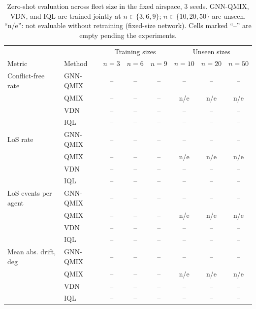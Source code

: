 \begin{table}[hbt!]
\caption{\label{tab:zeroshot} Zero-shot evaluation across fleet size in the fixed airspace,
3 seeds. GNN-QMIX, VDN, and IQL are trained jointly at $n\in\{3,6,9\}$; $n\in\{10,20,50\}$ are unseen. ``n/e'': not evaluable
without retraining (fixed-size network). Cells marked ``--'' are empty pending the
experiments.}
\centering
\begin{tabular}{llcccccc}
\hline
 & & \multicolumn{3}{c}{Training sizes} & \multicolumn{3}{c}{Unseen sizes} \\
Metric & Method & $n=3$ & $n=6$ & $n=9$ & $n=10$ & $n=20$ & $n=50$ \\
\hline
Conflict-free rate & GNN-QMIX & -- & -- & -- & -- & -- & -- \\
                   & QMIX     & -- & -- & -- & n/e & n/e & n/e \\
                   & VDN      & -- & -- & -- & -- & -- & -- \\
                   & IQL      & -- & -- & -- & -- & -- & -- \\
\hline
LoS rate           & GNN-QMIX & -- & -- & -- & -- & -- & -- \\
                   & QMIX     & -- & -- & -- & n/e & n/e & n/e \\
                   & VDN      & -- & -- & -- & -- & -- & -- \\
                   & IQL      & -- & -- & -- & -- & -- & -- \\
\hline
LoS events per agent & GNN-QMIX & -- & -- & -- & -- & -- & -- \\
                   & QMIX     & -- & -- & -- & n/e & n/e & n/e \\
                   & VDN      & -- & -- & -- & -- & -- & -- \\
                   & IQL      & -- & -- & -- & -- & -- & -- \\
\hline
Mean abs. drift, deg & GNN-QMIX & -- & -- & -- & -- & -- & -- \\
                   & QMIX     & -- & -- & -- & n/e & n/e & n/e \\
                   & VDN      & -- & -- & -- & -- & -- & -- \\
                   & IQL      & -- & -- & -- & -- & -- & -- \\
\hline
\end{tabular}
\end{table}

